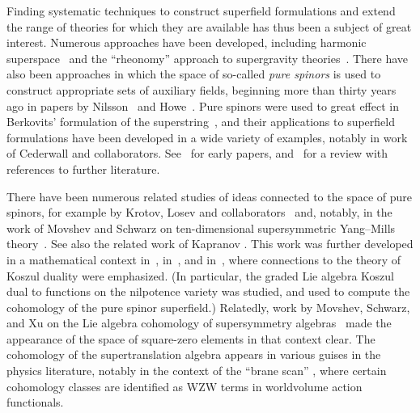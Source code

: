 \documentclass[10pt,a4paper]{amsart}
\numberwithin{equation}{section}
\begin{document}
Finding systematic techniques to construct superfield formulations and extend the range of theories for which they are available has thus been a subject of great interest. Numerous approaches have been developed, including harmonic superspace~\cite{HSbook} and the ``rheonomy'' approach to supergravity theories~\cite{CdAF}. There have also been approaches in which the space of so-called \emph{pure spinors} is used to construct appropriate sets of auxiliary fields, beginning more than thirty years ago in papers by Nilsson~\cite{Nilsson} and Howe~\cite{HowePS1,HowePS2}. Pure spinors were used to great effect in Berkovits' formulation of the superstring~\cite{Berkovits}, and their applications to superfield formulations have been developed in a wide variety of examples, notably in work of Cederwall and collaborators. See~\cite{character, CNT2, CederwallM5} for early papers, and~\cite{Cederwall} for a review with references to further literature.

There have been numerous related studies of ideas connected to the space of pure spinors, for example by Krotov, Losev and collaborators~\cite{AKLL,KroLoCS} and, notably, in the work of Movshev and Schwarz on ten-dimensional supersymmetric Yang--Mills theory~\cite{Mov1,Mov2,MovshevGeometryPureSpinor, MS1,MS2}. See also the related work of Kapranov \cite{KapranovSuper}. This work was further developed in a mathematical context in~\cite{GKR}, in~\cite{GS}, and in~\cite{GGST}, where connections to the theory of Koszul duality were emphasized.
(In particular, the graded Lie algebra Koszul dual to functions on the nilpotence variety was studied, and used to compute the cohomology of the pure spinor superfield.)
Relatedly, work by Movshev, Schwarz, and Xu on the Lie algebra cohomology of supersymmetry algebras~\cite{MSX1,MSX2} made the appearance of the space of square-zero elements in that context clear. The cohomology of the supertranslation algebra appears in various guises in the physics literature, notably in the context of the ``brane scan'' \cite{OBS, FSS, HuertaThesis}, where certain cohomology classes are identified as WZW terms in worldvolume action functionals.
\end{document}
